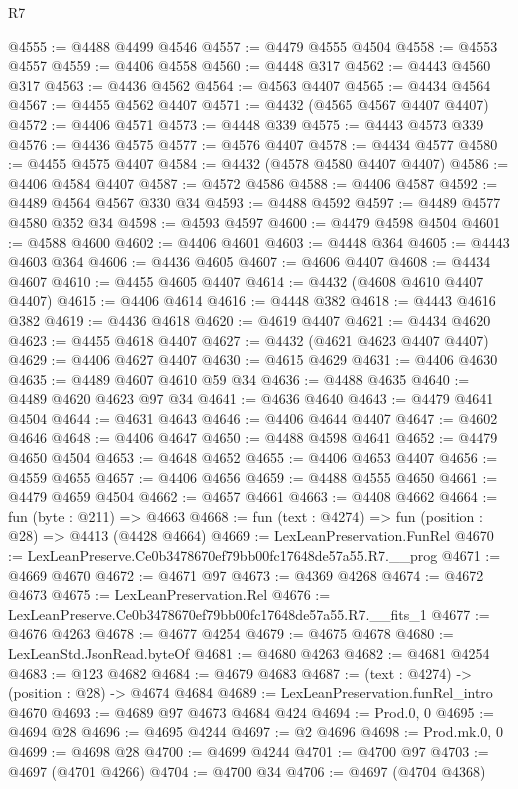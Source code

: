\begin{lexlean}{R7}
\begin{coremodule}
@4555 := @4488 @4499 @4546
@4557 := @4479 @4555 @4504
@4558 := @4553 @4557
@4559 := @4406 @4558
@4560 := @4448 @317
@4562 := @4443 @4560 @317
@4563 := @4436 @4562
@4564 := @4563 @4407
@4565 := @4434 @4564
@4567 := @4455 @4562 @4407
@4571 := @4432 (@4565 @4567 @4407 @4407)
@4572 := @4406 @4571
@4573 := @4448 @339
@4575 := @4443 @4573 @339
@4576 := @4436 @4575
@4577 := @4576 @4407
@4578 := @4434 @4577
@4580 := @4455 @4575 @4407
@4584 := @4432 (@4578 @4580 @4407 @4407)
@4586 := @4406 @4584 @4407
@4587 := @4572 @4586
@4588 := @4406 @4587
@4592 := @4489 @4564 @4567 @330 @34
@4593 := @4488 @4592
@4597 := @4489 @4577 @4580 @352 @34
@4598 := @4593 @4597
@4600 := @4479 @4598 @4504
@4601 := @4588 @4600
@4602 := @4406 @4601
@4603 := @4448 @364
@4605 := @4443 @4603 @364
@4606 := @4436 @4605
@4607 := @4606 @4407
@4608 := @4434 @4607
@4610 := @4455 @4605 @4407
@4614 := @4432 (@4608 @4610 @4407 @4407)
@4615 := @4406 @4614
@4616 := @4448 @382
@4618 := @4443 @4616 @382
@4619 := @4436 @4618
@4620 := @4619 @4407
@4621 := @4434 @4620
@4623 := @4455 @4618 @4407
@4627 := @4432 (@4621 @4623 @4407 @4407)
@4629 := @4406 @4627 @4407
@4630 := @4615 @4629
@4631 := @4406 @4630
@4635 := @4489 @4607 @4610 @59 @34
@4636 := @4488 @4635
@4640 := @4489 @4620 @4623 @97 @34
@4641 := @4636 @4640
@4643 := @4479 @4641 @4504
@4644 := @4631 @4643
@4646 := @4406 @4644 @4407
@4647 := @4602 @4646
@4648 := @4406 @4647
@4650 := @4488 @4598 @4641
@4652 := @4479 @4650 @4504
@4653 := @4648 @4652
@4655 := @4406 @4653 @4407
@4656 := @4559 @4655
@4657 := @4406 @4656
@4659 := @4488 @4555 @4650
@4661 := @4479 @4659 @4504
@4662 := @4657 @4661
@4663 := @4408 @4662
@4664 := fun (byte : @211) => @4663
@4668 := fun (text : @4274) => fun (position : @28) => @4413 (@4428 @4664)
@4669 := LexLeanPreservation.FunRel
@4670 := LexLeanPreserve.Ce0b3478670ef79bb00fc17648de57a55.R7.__prog
@4671 := @4669 @4670
@4672 := @4671 @97
@4673 := @4369 @4268
@4674 := @4672 @4673
@4675 := LexLeanPreservation.Rel
@4676 := LexLeanPreserve.Ce0b3478670ef79bb00fc17648de57a55.R7.__fits_1
@4677 := @4676 @4263
@4678 := @4677 @4254
@4679 := @4675 @4678
@4680 := LexLeanStd.JsonRead.byteOf
@4681 := @4680 @4263
@4682 := @4681 @4254
@4683 := @123 @4682
@4684 := @4679 @4683
@4687 := (text : @4274) -> (position : @28) -> @4674 @4684
@4689 := LexLeanPreservation.funRel_intro @4670
@4693 := @4689 @97 @4673 @4684 @424
@4694 := Prod.{0, 0}
@4695 := @4694 @28
@4696 := @4695 @4244
@4697 := @2 @4696
@4698 := Prod.mk.{0, 0}
@4699 := @4698 @28
@4700 := @4699 @4244
@4701 := @4700 @97
@4703 := @4697 (@4701 @4266)
@4704 := @4700 @34
@4706 := @4697 (@4704 @4368)

\end{coremodule}
\end{lexlean}
